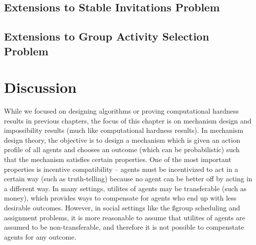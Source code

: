\subsection{Extensions to Stable Invitations Problem}


\subsection{Extensions to Group Activity Selection Problem}


\section{Discussion}

While we focused on designing algorithms or proving computational hardness results in previous chapters, the focus of this chapter is on mechanism design and impossibility results (much like computational hardness results). In mechanism design theory, the objective is to design a mechanism which is given an action profile of all agents and chooses an outcome (which can be probabilistic) such that the mechanism satisfies certain properties. One of the most important properties is incentive compatibility -- agents must be incentivized to act in a certain way (such as truth-telling) because no agent can be better off by acting in a different way. In many settings, utilites of agents may be transferable (such as money), which provides ways to compensate for agents who end up with less desirable outcomes. However, in social settings like the ßgroup scheduling and assignment problems, it is more reasonable to assume that utilites of agents are assumed to be non-transferable, and therefore it is not possible to compenstate agents for any outcome. 
